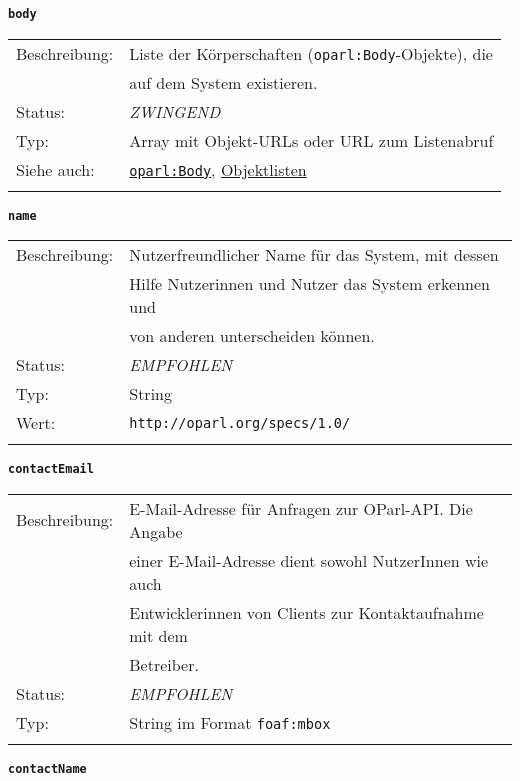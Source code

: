 \documentclass[,a4paper]{article}
\begin{document}
\textbf{\texttt{body}}

\begin{longtable}[c]{@{}ll@{}}
\toprule\addlinespace
Beschreibung: & Liste der Körperschaften (\texttt{oparl:Body}-Objekte),
die
\\\addlinespace
& auf dem System existieren.
\\\addlinespace
Status: & \emph{ZWINGEND}
\\\addlinespace
Typ: & Array mit Objekt-URLs oder URL zum Listenabruf
\\\addlinespace
Siehe auch: & \hyperref[oparlux5fbody]{\texttt{oparl:Body}},
\hyperref[objektlisten]{Objektlisten}
\\\addlinespace
\bottomrule
\end{longtable}

\textbf{\texttt{name}}

\begin{longtable}[c]{@{}ll@{}}
\toprule\addlinespace
Beschreibung: & Nutzerfreundlicher Name für das System, mit dessen
\\\addlinespace
& Hilfe Nutzerinnen und Nutzer das System erkennen und
\\\addlinespace
& von anderen unterscheiden können.
\\\addlinespace
Status: & \emph{EMPFOHLEN}
\\\addlinespace
Typ: & String
\\\addlinespace
Wert: & \texttt{http://oparl.org/specs/1.0/}
\\\addlinespace
\bottomrule
\end{longtable}

\textbf{\texttt{contactEmail}}

\begin{longtable}[c]{@{}ll@{}}
\toprule\addlinespace
Beschreibung: & E-Mail-Adresse für Anfragen zur OParl-API. Die Angabe
\\\addlinespace
& einer E-Mail-Adresse dient sowohl NutzerInnen wie auch
\\\addlinespace
& Entwicklerinnen von Clients zur Kontaktaufnahme mit dem
\\\addlinespace
& Betreiber.
\\\addlinespace
Status: & \emph{EMPFOHLEN}
\\\addlinespace
Typ: & String im Format \texttt{foaf:mbox}
\\\addlinespace
\bottomrule
\end{longtable}

\textbf{\texttt{contactName}}
\end{document}
